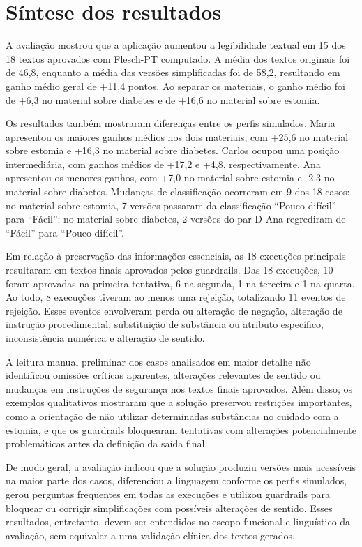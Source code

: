 \section{Síntese dos resultados}
\label{sec:sintese-resultados-avaliacao}

A avaliação mostrou que a aplicação aumentou a legibilidade textual em 15 dos 18 textos aprovados com Flesch-PT computado. A média dos textos originais foi de 46,8, enquanto a média das versões simplificadas foi de 58,2, resultando em ganho médio geral de +11,4 pontos. Ao separar os materiais, o ganho médio foi de +6,3 no material sobre diabetes e de +16,6 no material sobre estomia.

Os resultados também mostraram diferenças entre os perfis simulados. Maria apresentou os maiores ganhos médios nos dois materiais, com +25,6 no material sobre estomia e +16,3 no material sobre diabetes. Carlos ocupou uma posição intermediária, com ganhos médios de +17,2 e +4,8, respectivamente. Ana apresentou os menores ganhos, com +7,0 no material sobre estomia e -2,3 no material sobre diabetes. Mudanças de classificação ocorreram em 9 dos 18 casos: no material sobre estomia, 7 versões passaram da classificação ``Pouco difícil'' para ``Fácil''; no material sobre diabetes, 2 versões do par D-Ana regrediram de ``Fácil'' para ``Pouco difícil''.

Em relação à preservação das informações essenciais, as 18 execuções principais resultaram em textos finais aprovados pelos guardrails. Das 18 execuções, 10 foram aprovadas na primeira tentativa, 6 na segunda, 1 na terceira e 1 na quarta. Ao todo, 8 execuções tiveram ao menos uma rejeição, totalizando 11 eventos de rejeição. Esses eventos envolveram perda ou alteração de negação, alteração de instrução procedimental, substituição de substância ou atributo específico, inconsistência numérica e alteração de sentido.

A leitura manual preliminar dos casos analisados em maior detalhe não identificou omissões críticas aparentes, alterações relevantes de sentido ou mudanças em instruções de segurança nos textos finais aprovados. Além disso, os exemplos qualitativos mostraram que a solução preservou restrições importantes, como a orientação de não utilizar determinadas substâncias no cuidado com a estomia, e que os guardrails bloquearam tentativas com alterações potencialmente problemáticas antes da definição da saída final.

De modo geral, a avaliação indicou que a solução produziu versões mais acessíveis na maior parte dos casos, diferenciou a linguagem conforme os perfis simulados, gerou perguntas frequentes em todas as execuções e utilizou guardrails para bloquear ou corrigir simplificações com possíveis alterações de sentido. Esses resultados, entretanto, devem ser entendidos no escopo funcional e linguístico da avaliação, sem equivaler a uma validação clínica dos textos gerados.

